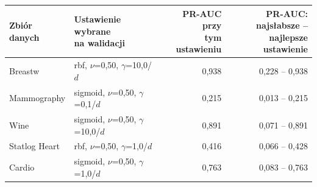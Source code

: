 \begin{tabular}{llrr}
\toprule
Zbiór danych & \makecell[l]{Ustawienie wybrane\\na walidacji} & \makecell[r]{PR-AUC przy\\tym ustawieniu} & \makecell[r]{PR-AUC: najsłabsze --\\najlepsze ustawienie} \\
\midrule
Breastw & rbf, $\nu$=0,50, $\gamma$=10,0/$d$ & 0,938 & 0,228 -- 0,938 \\
Mammography & sigmoid, $\nu$=0,50, $\gamma$=0,1/$d$ & 0,215 & 0,013 -- 0,215 \\
Wine & sigmoid, $\nu$=0,50, $\gamma$=10,0/$d$ & 0,891 & 0,071 -- 0,891 \\
Statlog Heart & rbf, $\nu$=0,50, $\gamma$=1,0/$d$ & 0,416 & 0,066 -- 0,428 \\
Cardio & sigmoid, $\nu$=0,50, $\gamma$=1,0/$d$ & 0,763 & 0,083 -- 0,763 \\
\bottomrule
\end{tabular}

